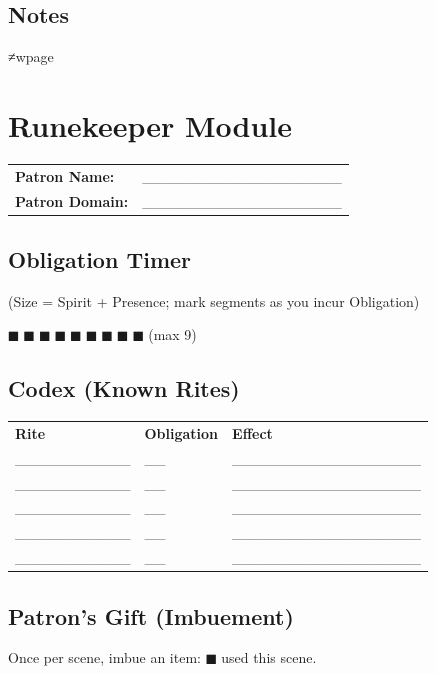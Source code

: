 \documentclass[11pt]{article}
\begin{document}
\subsection*{Notes}
\vspace{6cm}
≠wpage

\section*{Runekeeper Module}

\noindent
\begin{tabularx}{\textwidth}{X X}
\textbf{Patron Name:} & ___________________ \\
\textbf{Patron Domain:} & ___________________ \\
\end{tabularx}

\subsection*{Obligation Timer }
(Size = Spirit + Presence; mark segments as you incur Obligation)
\begin{center}
$■$ $■$ $■$ $■$ $■$ $■$ $■$ $■$ $■$ (max 9)
\end{center}

\subsection*{Codex (Known Rites)}
\small
\begin{tabularx}{\textwidth}{p{3cm} p{1.5cm} X}
\textbf{Rite} & \textbf{Obligation} & \textbf{Effect} \\
___________ & __ & __________________ \\
___________ & __ & __________________ \\
___________ & __ & __________________ \\
___________ & __ & __________________ \\
___________ & __ & __________________ \\
\end{tabularx}
\normalsize

\subsection*{Patron's Gift (Imbuement)}
Once per scene, imbue an item: $■$ used this scene.
\end{document}

